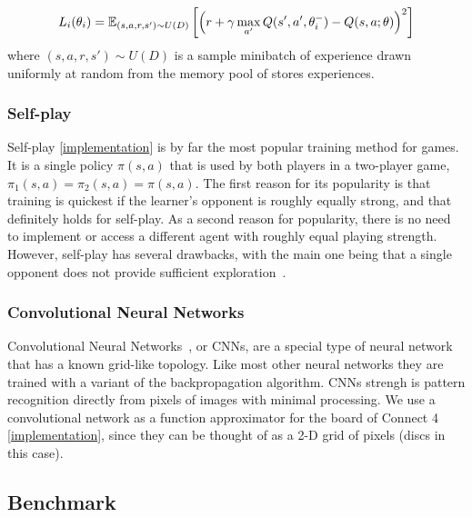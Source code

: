 \documentclass{article}
\newcommand{\GithubURL}[1]{[\href{https://github.com/davidrobles/mlnd-capstone-code/blob/master/#1}{implementation}]}
\begin{document}
\begin{equation}
L_i(\theta_i) = \mathbb{E}_{(s, a, r, s') \sim U(D)} \\
                \left[\left(r + \gamma \max_{a'} Q(s',a', \theta^-_i) - Q(s,a;\theta)\right)^2\right]
\end{equation}
where $(s, a, r, s') \sim U(D)$ is a sample minibatch of experience drawn uniformly at random from
the memory pool of stores experiences.

\subsubsection{Self-play}

Self-play \GithubURL{capstone/rl/learners/qlearning_approx.py\#L24} is by far the most popular
training method for games. It is a single policy $\pi(s,a)$ that is used by both players in a
two-player game, $\pi_1(s,a) = \pi_2(s,a) = \pi(s,a)$. The first reason for its popularity is that
training is quickest if the learner's opponent is roughly equally strong, and that definitely holds
for self-play. As a second reason for popularity, there is no need to implement or access a
different agent with roughly equal playing strength. However, self-play has several drawbacks, with
the main one being that a single opponent does not provide sufficient
exploration~\citep{Szita2011RLGames}.

\subsubsection{Convolutional Neural Networks}

Convolutional Neural Networks~\citep{LeCun1989}, or CNNs, are a special type of neural network that
has a known grid-like topology. Like most other neural networks they are trained with a variant of
the backpropagation algorithm. CNNs strengh is pattern recognition directly from pixels of images
with minimal processing. We use a convolutional network as a function approximator for the board of
Connect 4 \GithubURL{capstone/rl/value_functions/c4deepnetwork.py\#L42}, since they can be thought
of as a 2-D grid of pixels (discs in this case).

\subsection{Benchmark}
\label{sec:benchmark}
\end{document}
